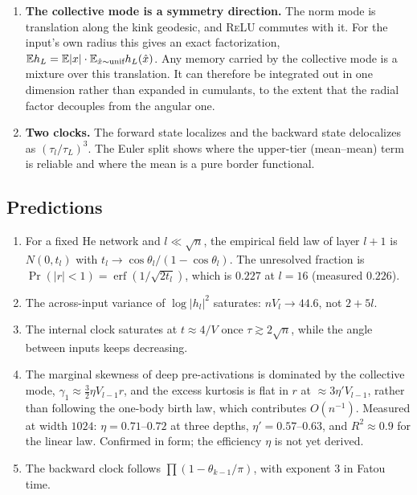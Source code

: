 \begin{enumerate}[leftmargin=*]
\item \textbf{The collective mode is a symmetry direction.} The norm mode is translation along the kink geodesic, and
\textsc{ReLU} commutes with it. For the input's own radius this gives an exact factorization, $\mathbb E h_L=\mathbb E|x|\cdot\mathbb E_{\hat x\sim\text{unif}}h_L(\hat x)$.
Any memory carried by the collective mode is a mixture over this translation. It can therefore be integrated out in one dimension
rather than expanded in cumulants, to the extent that the radial factor decouples from the angular one.
\item \textbf{Two clocks.} The forward state localizes and the backward state delocalizes as $(\tau_l/\tau_L)^3$. The Euler split shows where
the upper-tier (mean--mean) term is reliable and where the mean is a pure border functional.
\end{enumerate}

\subsection{Predictions}
\begin{enumerate}[leftmargin=*]
\item For a fixed He network and $l\ll\sqrt n$, the empirical field law of layer $l+1$ is $N(0,t_l)$ with $t_l\to\cos\theta_l/(1-\cos\theta_l)$. The
unresolved fraction is $\Pr(|r|<1)=\operatorname{erf}(1/\sqrt{2t_l})$, which is $0.227$ at $l=16$ (measured $0.226$).
\item The across-input variance of $\log|h_l|^2$ saturates: $nV_l\to44.6$, not $2+5l$.
\item The internal clock saturates at $t\approx4/V$ once $\tau\gtrsim2\sqrt n$, while the angle between inputs keeps decreasing.
\item The marginal skewness of deep pre-activations is dominated by the collective mode, $\gamma_1\approx\frac32\eta V_{l-1}r$, and the excess
kurtosis is flat in $r$ at $\approx3\eta' V_{l-1}$, rather than following the one-body birth law, which contributes $O(n^{-1})$. Measured at
width $1024$: $\eta=0.71$--$0.72$ at three depths, $\eta'=0.57$--$0.63$, and $R^2\approx0.9$ for the linear law. Confirmed in form; the
efficiency $\eta$ is not yet derived.
\item The backward clock follows $\prod(1-\theta_{k-1}/\pi)$, with exponent $3$ in Fatou time.
\end{enumerate}

